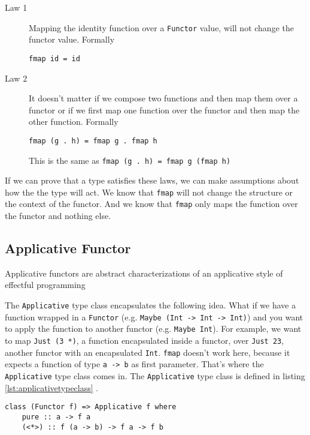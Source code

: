 \begin{description}
\item[Law 1] Mapping the identity function over a \verb|Functor| value, will not change the functor value. Formally
\begin{verbatim}
fmap id = id
\end{verbatim}
\item[Law 2] It doesn't matter if we compose two functions and then map them over a functor or if we first map one function over the functor and then map the other function. Formally
\begin{verbatim}
fmap (g . h) = fmap g . fmap h
\end{verbatim}
This is the same as \verb|fmap (g . h) = fmap g (fmap h)|
\end{description}

If we can prove that a type satisfies these laws, we can make assumptions about how the the type will act. We know that \verb|fmap| will not change the structure or the context of the functor.
And we know that \verb|fmap| only maps the function over the functor and nothing else. 

\subsection{Applicative Functor}
\label{sec:applicatives}

Applicative functors are abstract characterizations of an applicative style of effectful programming \cite{mcbride} \cite{control.applicative}

The \verb|Applicative| type class encapsulates the following idea. What if we have a function wrapped in a \verb|Functor| (e.g. \verb|Maybe (Int -> Int -> Int)|) and you want to apply the function to another functor (e.g. \verb|Maybe Int|). For example, we want to map \verb|Just (3 *)|, a function encapsulated inside a functor, over \verb|Just 23|, another functor with an encapsulated \verb|Int|. \verb|fmap| doesn't work here, because it expects a function of type \verb|a -> b| as first parameter. That's where the \verb|Applicative| type class comes in. 
The \verb|Applicative| type class is defined in listing \ref{lst:applicativetypeclass} \cite{control.applicative}.
\begin{lstlisting}[caption={Declaration of {\ttfamily Applicative} type class},label={lst:applicativetypeclass}]
class (Functor f) => Applicative f where
    pure :: a -> f a
    (<*>) :: f (a -> b) -> f a -> f b
\end{lstlisting}

